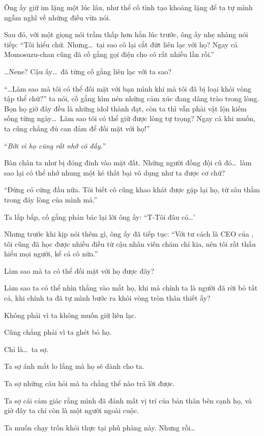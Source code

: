 \documentclass[../main.tex]{subfiles}
\begin{document}
Ông ấy giữ im lặng một lúc lâu, như thể cố tình tạo khoảng lặng để ta tự mình ngẫm nghĩ về những điều vừa nói.

Sau đó, với một giọng nói trầm thấp hơn hẳn lúc trước, ông ấy nhẹ nhàng nói tiếp: ``Tôi hiểu chứ. Nhưng\dots\ tại sao cô lại cắt đứt liên lạc với họ? Ngay cả Momosuzu-chan cũng đã cố gắng gọi điện cho cô rất nhiều lần rồi.''

\dots Nene? Cậu ấy\dots\ đã từng cố gắng liên lạc với ta sao?

``\dots Làm sao mà tôi có thể đối mặt với bạn mình khi mà tôi đã bị loại khỏi vòng tập thể chứ?'' ta nói, cố gắng kìm nén những cảm xúc đang dâng trào trong lòng. Bọn họ giờ đây đều là những idol thành đạt, còn ta thì vẫn phải vật lộn kiếm sống từng ngày\dots\ Làm sao tôi có thể giữ được lòng tự trọng? Ngay cả khi muốn, ta cũng chẳng đủ can đảm để đối mặt với họ!''

``\emph{Bởi vì họ cũng rất nhớ cô đấy.}''

Bàn chân ta như bị đóng đinh vào mặt đất. Những người đồng đội cũ đó\dots\ làm sao lại có thể nhớ nhung một kẻ thất bại vô dụng như ta được cơ chứ?

``Đừng có cứng đầu nữa. Tôi biết cô cũng khao khát được gặp lại họ, từ sâu thẳm trong đáy lòng của mình mà.''

Ta lắp bắp, cố gắng phản bác lại lời ông ấy: ``T-Tôi đâu có\dots'

Nhưng trước khi kịp nói thêm gì, ông ấy đã tiếp tục: ``Với tư cách là CEO của \hll, tôi cũng đã học được nhiều điều từ cậu nhân viên chăm chỉ kia, nên tôi rất thấu hiểu mọi người, kể cả cô nữa.''

Làm sao mà ta có thể đối mặt với họ được đây?

Làm sao ta có thể nhìn thẳng vào mắt họ, khi mà chính ta là người đã rời bỏ tất cả, khi chính ta đã tự mình bước ra khỏi vòng tròn thân thiết ấy?

Không phải vì ta không muốn giữ liên lạc.

Cũng chẳng phải vì ta ghét bỏ họ.

Chỉ là\dots\ ta sợ.

Ta sợ ánh mắt lo lắng mà họ sẽ dành cho ta.

Ta sợ những câu hỏi mà ta chẳng thể nào trả lời được.

Ta sợ cái cảm giác rằng mình đã đánh mất vị trí của bản thân bên cạnh họ, và giờ đây ta chỉ còn là một người ngoài cuộc.

Ta muốn chạy trốn khỏi thực tại phũ phàng này.
Nhưng rồi\dots
\end{document}
